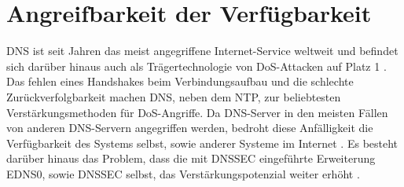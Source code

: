 \section{Angreifbarkeit der Verfügbarkeit}
\label{sec:thread-dosamp}

DNS ist seit Jahren das meist angegriffene Internet-Service weltweit und befindet sich darüber hinaus auch als Trägertechnologie von DoS-Attacken auf Platz 1 \cite{Alcoy2017}. Das fehlen eines Handshakes beim Verbindungsaufbau und die schlechte Zurückverfolgbarkeit machen DNS, neben dem \ac{NTP}, zur beliebtesten Verstärkungsmethoden für DoS-Angriffe. Da DNS-Server in den meisten Fällen von anderen DNS-Servern angegriffen werden, bedroht diese Anfälligkeit die Verfügbarkeit des Systems selbst, sowie anderer Systeme im Internet \cite{Kambourakis2008}. Es besteht darüber hinaus das Problem, dass die mit \ac{DNSSEC} eingeführte Erweiterung EDNS0, sowie \ac{DNSSEC} selbst, das Verstärkungspotenzial weiter erhöht \cite{Anagnostopoulos2013}\cite{VanRijswijk-Deij2014}.
